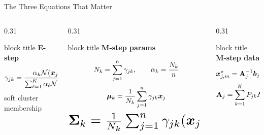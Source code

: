 \begin{frame}[shrink=7]{The Three Equations That Matter}
    \scriptsize
    \setlength{\abovedisplayskip}{0.35em}
    \setlength{\belowdisplayskip}{0.35em}
    \begin{columns}[T,onlytextwidth]
        \begin{column}{0.31\textwidth}
            \begin{beamercolorbox}[sep=0.65em, rounded=true, shadow=true]{block title}
                \textbf{E-step}
            \end{beamercolorbox}
            \[
                \gamma_{jk}=
                \frac{\alpha_k\mathcal{N}(\bm{x}_j\mid \bm{\mu}_k,\mathbf{\Sigma}_k)}
                {\sum_{\ell=1}^{K}\alpha_{\ell}\mathcal{N}(\bm{x}_j\mid \bm{\mu}_{\ell},\mathbf{\Sigma}_{\ell})}
            \]
            \vspace{0.1cm}
            \centering
            \footnotesize soft cluster membership
        \end{column}
        \begin{column}{0.31\textwidth}
            \begin{beamercolorbox}[sep=0.65em, rounded=true, shadow=true]{block title}
                \textbf{M-step params}
            \end{beamercolorbox}
            \[
                N_k=\sum_{j=1}^{n}\gamma_{jk},\qquad
                \alpha_k=\frac{N_k}{n}
            \]
            \[
                \bm{\mu}_k=\frac{1}{N_k}\sum_{j=1}^{n}\gamma_{jk}\bm{x}_j
            \]
            \[
                \resizebox{0.98\linewidth}{!}{$
                    \mat{\Sigma}_k=\frac{1}{\scal{N}_k}\sum_{j=1}^{\scal{n}}\scal{\gamma}_{jk}(\vect{x}_j-\vect{\mu}_k)(\vect{x}_j-\vect{\mu}_k)^\top
                $}
            \]
        \end{column}
        \begin{column}{0.31\textwidth}
            \begin{beamercolorbox}[sep=0.65em, rounded=true, shadow=true]{block title}
                \textbf{M-step data}
            \end{beamercolorbox}
            \[
                \bm{x}_{j,m}^{\star}=\mathbf{A}_j^{-1}\bm{b}_j
            \]
            \[
            \begin{aligned}
                \mat{A}_j
                &=
                \sum_{k=1}^{\scal{K}}\scal{P}_{jk}\mat{\Lambda}_{k,mm}\\

\end{aligned}\]
\end{column}
\end{columns}
\end{frame}
